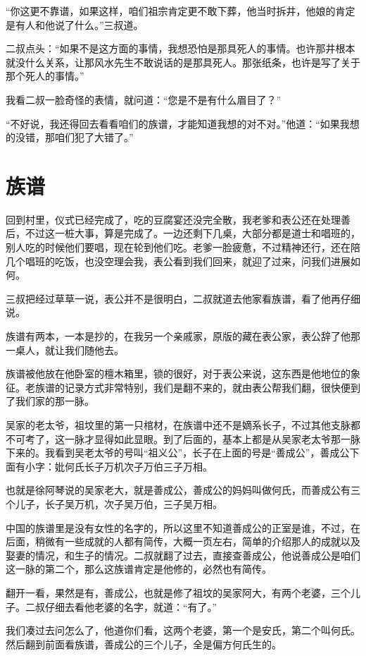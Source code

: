 “你这更不靠谱，如果这样，咱们祖宗肯定更不敢下葬，他当时拆井，他娘的肯定是有人和他说了什么。”三叔道。

二叔点头：“如果不是这方面的事情，我想恐怕是那具死人的事情。也许那井根本就没什么关系，让那风水先生不敢说话的是那具死人。那张纸条，也许是写了关于那个死人的事情。”

我看二叔一脸奇怪的表情，就问道：“您是不是有什么眉目了？”

“不好说，我还得回去看看咱们的族谱，才能知道我想的对不对。”他道：“如果我想的没错，那咱们犯了大错了。”

\chapter{族谱}

回到村里，仪式已经完成了，吃的豆腐宴还没完全散，我老爹和表公还在处理善后，不过这一桩大事，算是完成了。一边还剩下几桌，大部分都是道士和唱班的，别人吃的时候他们要唱，现在轮到他们吃。老爹一脸疲惫，不过精神还行，还在陪几个唱班的吃饭，也没空理会我，表公看到我们回来，就迎了过来，问我们进展如何。

三叔把经过草草一说，表公并不是很明白，二叔就道去他家看族谱，看了他再仔细说。

族谱有两本，一本是抄的，在我另一个亲戚家，原版的藏在表公家，表公辞了他那一桌人，就让我们随他去。

族谱被他放在他卧室的檀木箱里，锁的很好，对于表公来说，这东西是他地位的象征。老族谱的记录方式非常特别，我们是翻不来的，就由表公帮我们翻，很快便到了我们家的那一脉。

吴家的老太爷，祖坟里的第一只棺材，在族谱中还不是嫡系长子，不过其他支脉都不可考了，这一脉才显得如此显眼。到了后面的，基本上都是从吴家老太爷那一脉下来的。我看到吴老太爷的号叫“祖义公”，长子在上面的号是“善成公”，善成公下面有小字：妣何氏长子万机次子万伯三子万相。

也就是徐阿琴说的吴家老大，就是善成公，善成公的妈妈叫做何氏，而善成公有三个儿子，长子吴万机，次子吴万伯，三子吴万相。

中国的族谱里是没有女性的名字的，所以这里不知道善成公的正室是谁，不过，在后面，稍微有一些成就的人都有简传，大概一页左右，简单的介绍那人的成就以及娶妻的情况，和生子的情况。二叔就翻了过去，直接查善成公，他说善成公是咱们这一脉的第二个，那么这族谱肯定是他修的，必然也有简传。

翻开一看，果然是有，善成公，也就是修了祖坟的吴家阿大，有两个老婆，三个儿子。二叔仔细去看他老婆的名字，就道：“有了。”

我们凑过去问怎么了，他道你们看，这两个老婆，第一个是安氏，第二个叫何氏。然后翻到前面看族谱，善成公的三个儿子，全是偏方何氏生的。

